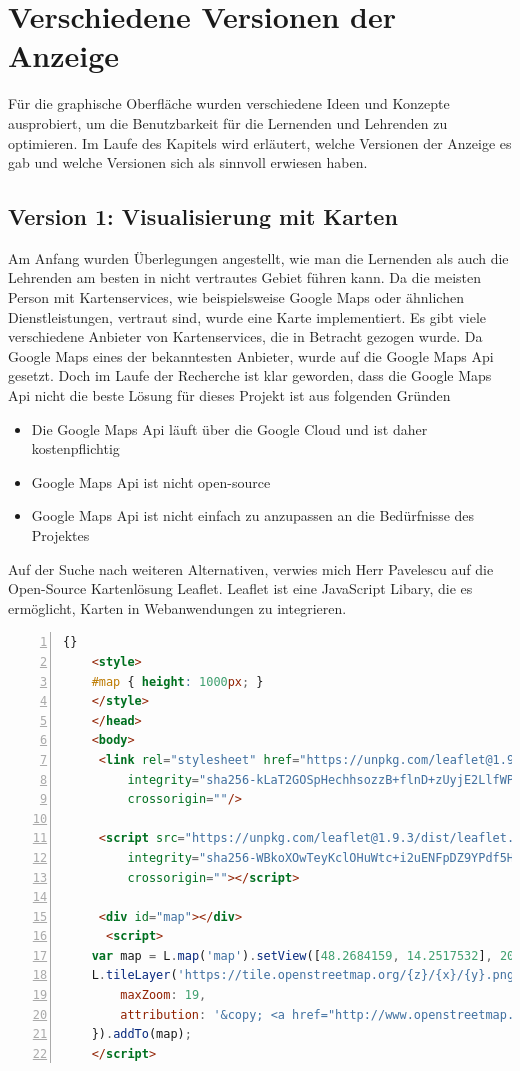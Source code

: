 \section{Verschiedene Versionen der Anzeige}
Für die graphische Oberfläche wurden verschiedene Ideen und Konzepte ausprobiert, um die Benutzbarkeit für die Lernenden und Lehrenden zu optimieren.
Im Laufe des Kapitels wird erläutert, welche Versionen der Anzeige es gab und welche Versionen sich als sinnvoll erwiesen haben.

\subsection{Version 1: Visualisierung mit Karten}
Am Anfang wurden Überlegungen angestellt, wie man die Lernenden als auch die Lehrenden am besten in nicht vertrautes Gebiet führen kann.
Da die meisten Person mit Kartenservices, wie beispielsweise Google Maps oder ähnlichen Dienstleistungen, vertraut sind, wurde eine Karte implementiert.
Es gibt viele verschiedene Anbieter von Kartenservices, die in Betracht gezogen wurde. 
Da Google Maps eines der bekanntesten Anbieter, wurde auf die Google Maps Api gesetzt. 
Doch im Laufe der Recherche ist klar geworden, dass die Google Maps Api nicht die beste Lösung für dieses Projekt ist  aus folgenden Gründen
\begin{itemize}
    \item Die Google Maps Api läuft über die Google Cloud und ist daher kostenpflichtig
    \item Google Maps Api ist nicht open-source
    \item Google Maps Api ist nicht einfach zu anzupassen an die Bedürfnisse des Projektes 
\end{itemize}

\cite{Agafonkin} Auf der Suche nach weiteren Alternativen, verwies mich Herr Pavelescu auf die Open-Source Kartenlösung Leaflet.
Leaflet ist eine JavaScript Libary, die es ermöglicht, Karten in Webanwendungen zu integrieren. 


\pagebreak

\begin{lstlisting}[numbers=left,language=HTML,caption={Implementierung einer Karte mit Leaflet},label={lst:leafletmap}]{}
    <style>
    #map { height: 1000px; }
    </style>
    </head>
    <body>
     <link rel="stylesheet" href="https://unpkg.com/leaflet@1.9.3/dist/leaflet.css"
         integrity="sha256-kLaT2GOSpHechhsozzB+flnD+zUyjE2LlfWPgU04xyI="
         crossorigin=""/>
    
     <script src="https://unpkg.com/leaflet@1.9.3/dist/leaflet.js"
         integrity="sha256-WBkoXOwTeyKclOHuWtc+i2uENFpDZ9YPdf5Hf+D7ewM="
         crossorigin=""></script>
    
     <div id="map"></div>
      <script>
    var map = L.map('map').setView([48.2684159, 14.2517532], 20);
    L.tileLayer('https://tile.openstreetmap.org/{z}/{x}/{y}.png', {
        maxZoom: 19,
        attribution: '&copy; <a href="http://www.openstreetmap.org/copyright">OpenStreetMap</a>'
    }).addTo(map);
    </script> 
\end{lstlisting}

